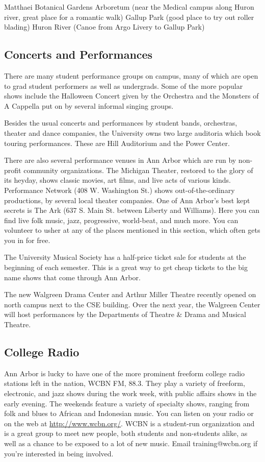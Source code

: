 \documentclass[11pt]{article}
\begin{document}
Matthaei Botanical Gardens
Arboretum (near the Medical campus along Huron river, great place for a romantic walk)
Gallup Park (good place to try out roller blading)
Huron River (Canoe from Argo Livery to Gallup Park)
\subsection{Concerts and Performances}
\label{sec-12_5}

There are many student performance groups on campus, many of which are
open to grad student performers as well as undergrads.  Some of the
more popular shows include the Halloween Concert given by the
Orchestra and the Monsters of A Cappella put on by several informal
singing groups.

Besides the usual concerts and performances by student bands,
orchestras, theater and dance companies, the University owns two large
auditoria which book touring performances.  These are Hill Auditorium
and the Power Center.

There are also several performance venues in Ann Arbor which are run
by non-profit community organizations.  The Michigan Theater, restored
to the glory of its heyday, shows classic movies, art films, and live
acts of various kinds.  Performance Network (408 W. Washington St.)
shows out-of-the-ordinary productions, by several local theater
companies.  One of Ann Arbor's best kept secrets is The Ark (637
S. Main St. between Liberty and Williams).  Here you can find live
folk music, jazz, progressive, world-beat, and much more.  You can
volunteer to usher at any of the places mentioned in this section,
which often gets you in for free.

The University Musical Society has a half-price ticket sale for
students at the beginning of each semester.  This is a great way to
get cheap tickets to the big name shows that come through Ann Arbor.

The new Walgreen Drama Center and Arthur Miller Theatre recently
opened on north campus next to the CSE building.  Over the next year,
the Walgreen Center will host performances by the Departments of
Theatre \& Drama and Musical Theatre.
\subsection{College Radio}
\label{sec-12_6}

Ann Arbor is lucky to have one of the more prominent freeform college
radio stations left in the nation, WCBN FM, 88.3.  They play a variety
of freeform, electronic, and jazz shows during the work week, with
public affairs shows in the early evening.  The weekends feature a
variety of specialty shows, ranging from folk and blues to African and
Indonesian music.  You can listen on your radio or on the web at
\href{http://www.wcbn.org/}{http://www.wcbn.org/}.  WCBN is a student-run organization and is a
great group to meet new people, both students and non-students alike,
as well as a chance to be exposed to a lot of new music.  Email
training@wcbn.org if you’re interested in being involved.
\end{document}
